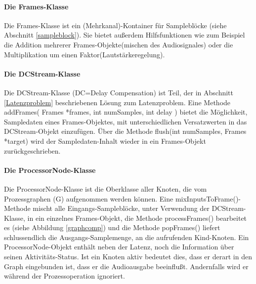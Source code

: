 \paragraph{Die Frames-Klasse}
Die Frames-Klasse ist ein (Mehrkanal)-Kontainer für Sampleblöcke (siehe Abschnitt \ref{sampleblock}). Sie bietet außerdem Hilfsfunktionen wie zum Beispiel die Addition mehrerer Frames-Objekte(mischen des Audiosignales) oder die Multiplikation um einen Faktor(Lautstärkeregelung).

\paragraph{Die DCStream-Klasse}
Die DCStream-Klasse (DC=Delay Compensation) ist Teil, der in Abschnitt \ref{Latenzproblem} beschriebenen Lösung zum Latenzproblem. Eine Methode addFrames( Frames *frames, int numSamples, int delay ) bietet die Möglichkeit, Sampledaten eines Frames-Objektes, mit unterschiedlichen Versatzwerten in das DCStream-Objekt einzufügen. Über die Methode flush(int numSamples, Frames *target) wird der Sampledaten-Inhalt wieder in ein Frames-Objekt zurückgeschrieben. 

\paragraph{\label{prnode}Die ProcessorNode-Klasse}
Die ProcessorNode-Klasse ist die Oberklasse aller Knoten, die vom Prozessgraphen (G) aufgenommen werden können.
Eine mixInputsToFrame()-Methode mischt alle Eingangs-Sampleblöcke, unter Verwendung der DCStream-Klasse, in ein einzelnes Frames-Objekt, die Methode processFrames() bearbeitet es (siehe Abbildung \ref{graphcomp}) und 
die Methode popFrames() liefert schlussendlich die Ausgangs-Samplemenge, an die aufrufenden Kind-Knoten.
Ein ProcessorNode-Objekt enthält neben der Latenz, noch die Information über seinen Aktivitäts-Status.
Ist ein Knoten aktiv bedeutet dies, dass er derart in den Graph eingebunden ist, dass er die Audioausgabe beeinflußt. Andernfalls wird er während der Prozessoperation ignoriert.



